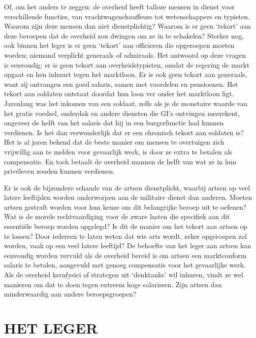 \documentclass[
  a5paper,
  smalldemyvopaper,10pt,twoside,onecolumn,openright,extrafontsizes,hidelinks]{memoir}
\begin{document}
Of, om het anders te zeggen: de overheid heeft talloze mensen in dienst
voor verschillende functies, van vrachtwagenchauffeurs tot
wetenschappers en typisten. Waarom zijn deze mensen dan niet
dienstplichtig? Waarom is er geen `tekort' aan deze beroepen dat de
overheid zou dwingen om ze in te schakelen? Sterker nog, ook binnen het
leger is er geen `tekort' aan officieren die opgeroepen moeten worden;
niemand verplicht generaals of admiraals. Het antwoord op deze vragen is
eenvoudig: er is geen tekort aan overheidstypisten, omdat de regering de
markt opgaat en hen inhuurt tegen het marktloon. Er is ook geen tekort
aan generaals, want zij ontvangen een goed salaris, samen met voordelen
en pensioenen. Het tekort aan soldaten ontstaat doordat hun loon ver
onder het marktloon ligt. Jarenlang was het inkomen van een soldaat,
zelfs als je de monetaire waarde van het gratis voedsel, onderdak en
andere diensten die GI's ontvingen meerekent, ongeveer de helft van het
salaris dat hij in een burgerfunctie had kunnen verdienen. Is het dan
verwonderlijk dat er een chronisch tekort aan soldaten is? Het is al
jaren bekend dat de beste manier om mensen te overtuigen zich vrijwillig
aan te melden voor gevaarlijk werk, is door ze extra te betalen als
compensatie. En toch betaalt de overheid mannen de helft van wat ze in
hun privéleven zouden kunnen verdienen.

Er is ook de bijzondere schande van de artsen dienstplicht, waarbij
artsen op veel latere leeftijden worden onderworpen aan de militaire
dienst dan anderen. Moeten artsen gestraft worden voor hun keuze om dit
belangrijke beroep uit te oefenen? Wat is de morele rechtvaardiging voor
de zware lasten die specifiek aan dit essentiële beroep worden opgelegd?
Is dit de manier om het tekort aan artsen op te lossen? Door iedereen te
laten weten dat wie arts wordt, zeker opgeroepen zal worden, vaak op een
veel latere leeftijd? De behoefte van het leger aan artsen kan eenvoudig
worden vervuld als de overheid bereid is om artsen een marktconform
salaris te betalen, aangevuld met genoeg compensatie voor het
gevaarlijke werk. Als de overheid kernfysici of strategen uit
`denktanks' wil inhuren, vindt ze wel manieren om dat te doen tegen
extreem hoge salarissen. Zijn artsen dan minderwaardig aan andere
beroepsgroepen?

\section{HET LEGER}\label{het-leger}
\end{document}
